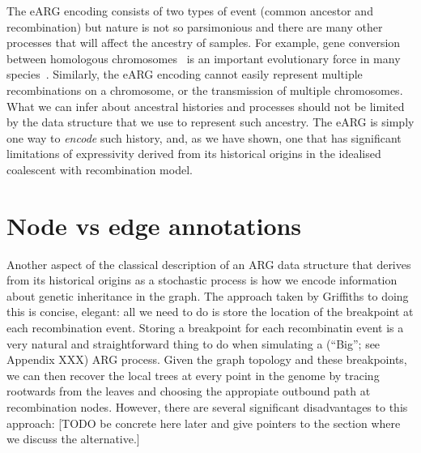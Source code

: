 \documentclass{article}
\begin{document}
The eARG encoding consists of two types of event
(common ancestor and recombination) but nature is not so parsimonious
and there are many other processes that will affect the
ancestry of samples.
For example, gene conversion between homologous
chromosomes~\citep{wiuf2000coalescent,chen2007gene} is an important
evolutionary force in many species~\cite[e.g.][]{yang2012great}.
Similarly, the eARG encoding cannot easily represent multiple
recombinations on a chromosome, or the transmission of multiple
chromosomes.
What we can infer about ancestral histories and
processes should not be limited by the data structure that we
use to represent such ancestry. The eARG is simply one way
to \emph{encode} such history, and, as we have shown,
one that has significant limitations of expressivity
derived from its historical origins in the idealised
coalescent with recombination model.

\section*{Node vs edge annotations}
Another aspect of the classical description of an ARG data structure that
derives from its historical origins as a stochastic
process is how we encode information about genetic
inheritance in the graph. The approach taken by Griffiths to
doing this is concise, elegant: all we need to do is store
the location of the breakpoint at each recombination event.
Storing a breakpoint for each recombinatin event is a very
natural and straightforward thing to do when simulating
a (``Big''; see Appendix XXX) ARG process.
Given the graph topology and these breakpoints, we can then
recover the
local trees at every point in the genome
by tracing rootwards from the leaves and choosing the
appropiate outbound path at recombination nodes.
However, there are several significant disadvantages
to this approach: [TODO be concrete here later
and give pointers to the section where we discuss the
alternative.]
\end{document}

